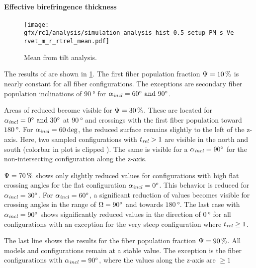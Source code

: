 \paragraph{Effective birefringence thickness \trel{}}
%
\begin{figure}[!p]
    \centering
    \texttt{[image: gfx/rc1/analysis/simulation\_analysis\_hist\_0.5\_setup\_PM\_s\_Vervet\_m\_r\_rtrel\_mean.pdf]}
    \caption{Mean \trel{} from tilt analysis. }
    \label{fig:sim_ana_trel}
\end{figure}
% 
The results of \trel{} are shown in \cref{fig:sim_ana_trel}.
The first fiber population fraction $\textnormal{$\Psi$}=\SI{10}{\percent}$ 
is nearly constant for all fiber configurations.
The exceptions are secondary fiber population inclinations of $\SI{90}{\degree}$ for $\modelInc=\SIlist{60;90}{\degree}$.
\par
% 
Areas of reduced \trel{} become visible for $\textnormal{$\Psi$}=\SI{30}{\percent}$.
These are located for $\modelInc=\SIlist{0;30}{\degree}$ at $\SI{90}{\degree}$ and crossings with the first fiber population toward $\SI{180}{\degree}$.
For $\textnormal{$\alpha_{\mathit{incl}}$}=\SI{60}{\deg}$, the reduced \trel{} surface remains slightly to the left of the z-axis.
Here, two sampled configurations with $\textnormal{$t_\mathit{rel}$} > 1$ are visible in the north and south (colorbar in plot is clipped ).
The same is visible for a $\textnormal{$\alpha_{\mathit{incl}}$}=\SI{90}{\degree}$ for the non-intersecting configuration along the z-axis.
\par
% 
$\textnormal{$\Psi$}=\SI{70}{\percent}$ shows only slightly reduced \trel{} values for configurations with high flat crossing angles for the flat configuration $\textnormal{$\alpha_{\mathit{incl}}$}=\SI{0}{\degree}$.
This behavior is reduced for $\textnormal{$\alpha_{\mathit{incl}}$}=\SI{30}{\degree}$.
For $\textnormal{$\alpha_{\mathit{incl}}$}=\SI{60}{\degree}$, a significant reduction of \trel{} values becomes visible for crossing angles in the range of $\textnormal{$\Omega$}=\SI{90}{\degree}$ and towards $\SI{180}{\degree}$.
The last case with $\textnormal{$\alpha_{\mathit{incl}}$}=\SI{90}{\degree}$ shows significantly reduced \trel{} values in the direction of $\SI{0}{\degree}$ for all configurations with an exception for the very steep configuration where $\textnormal{$t_\mathit{rel}$} \geq \SI{1}{}$.
\par
% 
The last line shows the results for the fiber population fraction $\textnormal{$\Psi$}=\SI{90}{\percent}$.
All models and configurations remain at a stable \trel{} value.
The exception is the fiber configurations with $\textnormal{$\alpha_{\mathit{incl}}$}=\SI{90}{\degree}$, where the \trel{} values along the z-axis are $\geq \SI{1}{}$
%
